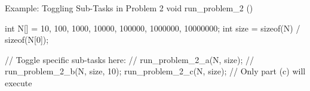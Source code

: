 \documentclass{article}
\begin{document}
\begin{codebox}{Example: Toggling Sub-Tasks in Problem 2}
void run_problem_2 (){
    int N[] = {10, 100, 1000, 10000, 100000, 1000000, 10000000};
    int size = sizeof(N) / sizeof(N[0]);

    // Toggle specific sub-tasks here:
    // run_problem_2_a(N, size); 
    // run_problem_2_b(N, size, 10);
    run_problem_2_c(N, size); // Only part (c) will execute
}
\end{codebox}
\end{document}
